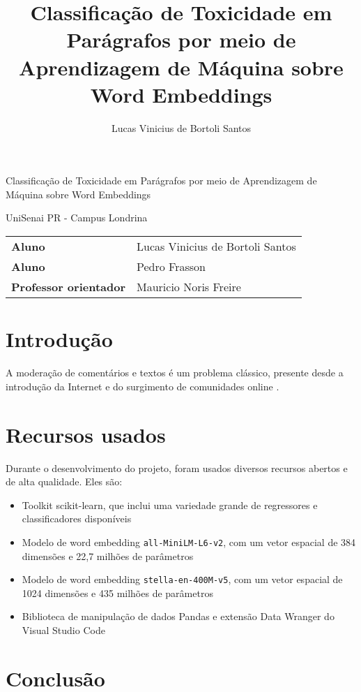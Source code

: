 \documentclass{article}
\title{Classificação de Toxicidade em Parágrafos por meio de Aprendizagem de Máquina sobre Word Embeddings}
\author{Lucas Vinicius de Bortoli Santos}
\begin{document}

\begin{titlepage}
    \begin{center}
        \Huge{Classificação de Toxicidade em Parágrafos por meio de Aprendizagem de Máquina sobre Word Embeddings}
        \vspace{64pt}

        \large{UniSenai PR - Campus Londrina}
        \vspace{48pt}

        \begin{tabular}{l l}
            \textbf{Aluno}                & Lucas Vinicius de Bortoli Santos \\
            \textbf{Aluno}                & Pedro Frasson                    \\
            \textbf{Professor orientador} & Mauricio Noris Freire
        \end{tabular}
    \end{center}
\end{titlepage}

\newpage

\tableofcontents

\newpage
\section{Introdução}

A moderação de comentários e textos é um problema clássico, presente desde a introdução da Internet e do surgimento de comunidades online \cite{DBLP:journals/corr/VaswaniSPUJGKP17}.

\section{Recursos usados}

Durante o desenvolvimento do projeto, foram usados diversos recursos abertos e de alta qualidade. Eles são:

\begin{itemize}
    \item Toolkit scikit-learn, que inclui uma variedade grande de regressores e classificadores disponíveis
    \item Modelo de word embedding \texttt{all-MiniLM-L6-v2}, com um vetor espacial de 384 dimensões e 22,7 milhões de parâmetros
    \item Modelo de word embedding \texttt{stella-en-400M-v5}, com um vetor espacial de 1024 dimensões e 435 milhões de parâmetros
    \item Biblioteca de manipulação de dados Pandas e extensão Data Wranger do Visual Studio Code
\end{itemize}

\newpage
\section{Conclusão}

\newpage

\printbibliography
\end{document}
